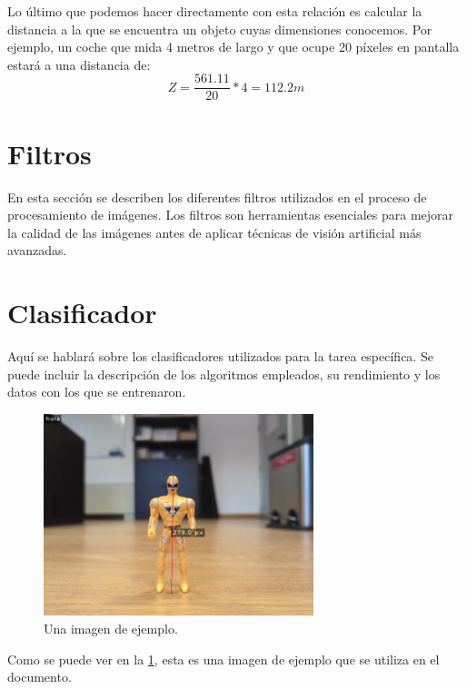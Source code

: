 \documentclass[12pt]{article}
\begin{document}
Lo último que podemos hacer directamente con esta relación es calcular la distancia a la que se encuentra un objeto cuyas dimensiones conocemos. Por ejemplo, un coche que mida 4 metros de largo y que ocupe 20 píxeles en pantalla estará a una distancia de:
$$
Z=\frac{561.11}{20}*4=112.2m
$$

\newpage

\section{Filtros}
En esta sección se describen los diferentes filtros utilizados en el proceso de procesamiento de imágenes. Los filtros son herramientas esenciales para mejorar la calidad de las imágenes antes de aplicar técnicas de visión artificial más avanzadas.



\newpage

\section{Clasificador}
Aquí se hablará sobre los clasificadores utilizados para la tarea específica. Se puede incluir la descripción de los algoritmos empleados, su rendimiento y los datos con los que se entrenaron.


\begin{figure}[h!]
    \centering
    \includegraphics[width=0.7\textwidth]{images_calibracion/Altura_objeto.png}  %
    \caption{Una imagen de ejemplo.}
    \label{fig:imagen_ejemplo}
\end{figure}

Como se puede ver en la \ref{fig:imagen_ejemplo}, esta es una imagen de ejemplo que se utiliza en el documento.
\end{document}
